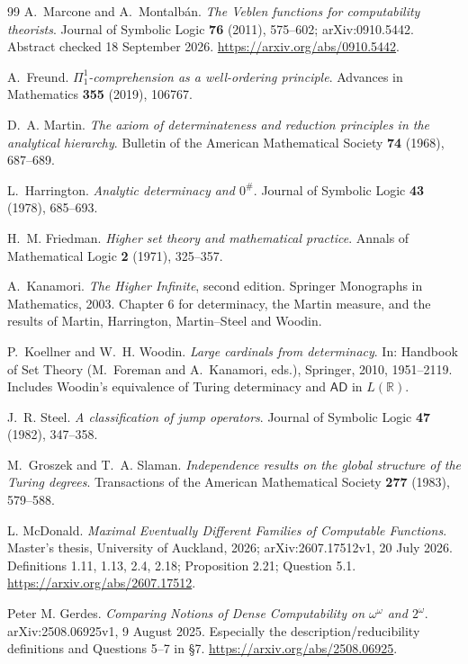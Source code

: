 \documentclass[11pt,a4paper]{article}
\theoremstyle{definition}\newtheorem{definition}[theorem]{Definition}
\theoremstyle{remark}\newtheorem{remark}[theorem]{Remark}
\begin{document}
\begin{thebibliography}{99}
A.~Marcone and A.~Montalb\'an.
\emph{The Veblen functions for computability theorists}.
Journal of Symbolic Logic \textbf{76} (2011), 575--602; arXiv:0910.5442.
Abstract checked 18 September 2026.
\url{https://arxiv.org/abs/0910.5442}.

A.~Freund.
\emph{$\Pi^1_1$-comprehension as a well-ordering principle}.
Advances in Mathematics \textbf{355} (2019), 106767.

D.~A. Martin.
\emph{The axiom of determinateness and reduction principles in the analytical hierarchy}.
Bulletin of the American Mathematical Society \textbf{74} (1968), 687--689.

L.~Harrington.
\emph{Analytic determinacy and $0^\#$}.
Journal of Symbolic Logic \textbf{43} (1978), 685--693.

H.~M. Friedman.
\emph{Higher set theory and mathematical practice}.
Annals of Mathematical Logic \textbf{2} (1971), 325--357.

A.~Kanamori.
\emph{The Higher Infinite}, second edition.
Springer Monographs in Mathematics, 2003.
Chapter 6 for determinacy, the Martin measure, and the results of Martin, Harrington, Martin--Steel and Woodin.

P.~Koellner and W.~H. Woodin.
\emph{Large cardinals from determinacy}.
In: Handbook of Set Theory (M.~Foreman and A.~Kanamori, eds.), Springer, 2010, 1951--2119.
Includes Woodin's equivalence of Turing determinacy and $\mathsf{AD}$ in $L(\mathbb R)$.

J.~R. Steel.
\emph{A classification of jump operators}.
Journal of Symbolic Logic \textbf{47} (1982), 347--358.

M.~Groszek and T.~A. Slaman.
\emph{Independence results on the global structure of the Turing degrees}.
Transactions of the American Mathematical Society \textbf{277} (1983), 579--588.

L. McDonald. \emph{Maximal Eventually Different Families of Computable
Functions}. Master's thesis, University of Auckland, 2026;
arXiv:2607.17512v1, 20 July 2026.
Definitions 1.11, 1.13, 2.4, 2.18; Proposition 2.21; Question 5.1.
\url{https://arxiv.org/abs/2607.17512}.

Peter M. Gerdes.
\emph{Comparing Notions of Dense Computability on $\omega^\omega$ and $2^\omega$}.
arXiv:2508.06925v1, 9 August 2025.
Especially the description/reducibility definitions and Questions 5--7 in \S7.
\url{https://arxiv.org/abs/2508.06925}.


\end{thebibliography}
\end{document}
